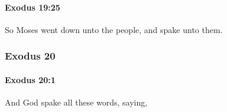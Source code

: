 		\paragraph{Exodus 19:25} %
			\label{EXODUS-19-25}

			So Moses went down unto the people, and spake unto them.

	\subsubsection{Exodus 20} %
		\label{EXODUS-20}

		\paragraph{Exodus 20:1} %
			\label{EXODUS-20-1}

			And God spake all these words, saying,


